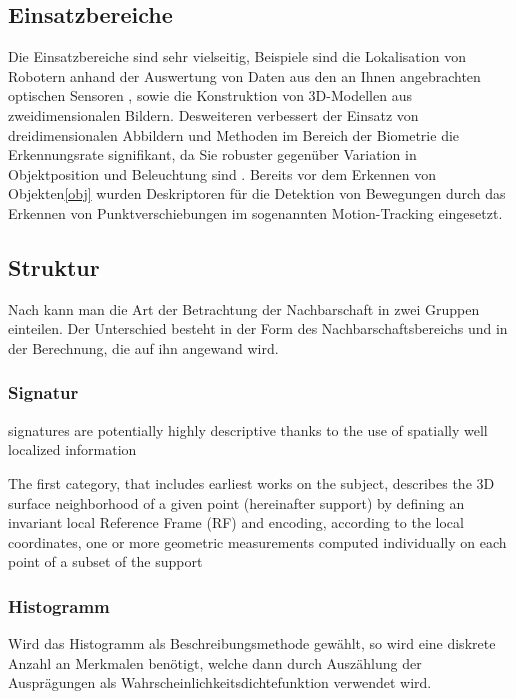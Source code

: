 \documentclass[12pt]{article}
\begin{document}
 

\subsection{Einsatzbereiche} Die Einsatzbereiche sind sehr vielseitig, Beispiele sind die Lokalisation von Robotern anhand der Auswertung von Daten aus den an Ihnen angebrachten optischen Sensoren \cite{robot} , sowie die Konstruktion von 3D-Modellen aus zweidimensionalen Bildern\cite{SpinImage}. Desweiteren verbessert der Einsatz von dreidimensionalen Abbildern und Methoden im Bereich der Biometrie die Erkennungsrate signifikant, da Sie robuster gegenüber Variation in Objektposition und Beleuchtung sind \cite{biometrics}.
Bereits vor dem Erkennen von Objekten\ref{obj} wurden Deskriptoren für die Detektion von Bewegungen durch das Erkennen von Punktverschiebungen im sogenannten Motion-Tracking eingesetzt.

\subsection{Struktur}



Nach \cite{SD} kann man die Art der Betrachtung der Nachbarschaft in zwei Gruppen einteilen. Der Unterschied besteht in der Form des Nachbarschaftsbereichs und in der Berechnung, die auf ihn angewand wird.
\subsubsection{Signatur}
 signatures are potentially highly descriptive
thanks to the use of spatially well localized information

The first category, that includes earliest works on the
subject, describes the 3D surface neighborhood of a given point (hereinafter support)
by defining an invariant local Reference Frame (RF) and encoding, according to the
local coordinates, one or more geometric measurements computed individually on each
point of a subset of the support

\subsubsection{Histogramm}
Wird das Histogramm als Beschreibungsmethode gewählt, so wird eine diskrete Anzahl an Merkmalen benötigt, welche dann durch Auszählung der Ausprägungen als Wahrscheinlichkeitsdichtefunktion verwendet wird. 
\end{document}
